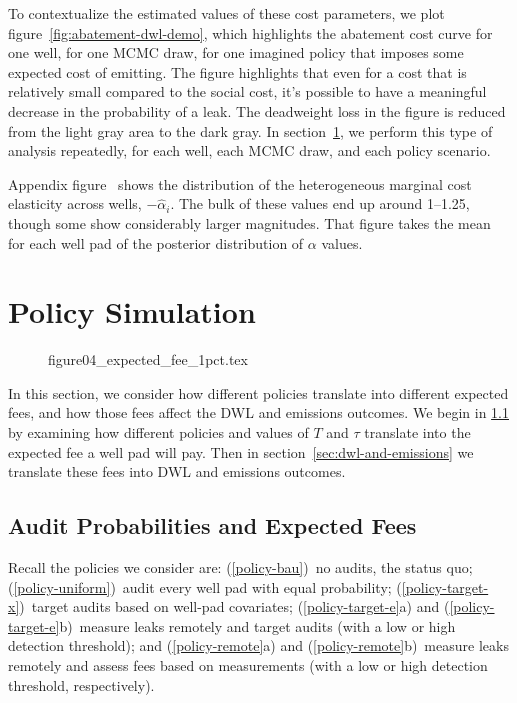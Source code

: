 To contextualize the estimated values of these cost parameters, we plot figure~\ref{fig:abatement-dwl-demo}, which highlights the abatement cost curve for one well, for one \gls{MCMC} draw, for one imagined policy that imposes some expected cost of emitting.
The figure highlights that even for a cost that is relatively small compared to the social cost, it's possible to have a meaningful decrease in the probability of a leak.
The deadweight loss in the figure is reduced from the light gray area to the dark gray.
In section~\ref{sec:policy-simulation}, we perform this type of analysis repeatedly, for each well, each \gls{MCMC} draw, and each policy scenario.


Appendix figure~\iftoggle{usexr}{\ref{fig:histogram-alphas}}{A9} shows the distribution of the heterogeneous marginal cost elasticity across wells, \(-\hat{\alpha}_i\).
The bulk of these values end up around 1--1.25, though some show considerably larger magnitudes.
That figure takes the mean for each well pad of the posterior distribution of \(\alpha\) values.


\section{Policy Simulation}
\label{sec:policy-simulation}


\begin{figure}[!bth]
{figure04_expected_fee_1pct.tex} %
\end{figure}

In this section, we consider how different policies translate into different expected fees, and how those fees affect the \gls{DWL} and emissions outcomes.
We begin in \ref{sec:audit-probabilities-and-expected-fees} by examining how different policies and values of \(T\) and \(\tau\) translate into the expected fee a well pad will pay.
Then in section~\ref{sec:dwl-and-emissions} we translate these fees into \gls{DWL} and emissions outcomes.


\subsection{Audit Probabilities and Expected Fees}
\label{sec:audit-probabilities-and-expected-fees}



Recall the policies we consider are:
(\ref{policy-bau})~no audits, the status quo;
(\ref{policy-uniform})~audit every well pad with equal probability;
(\ref{policy-target-x})~target audits based on well-pad covariates;
(\ref{policy-target-e}a) and (\ref{policy-target-e}b)~measure leaks remotely and target audits (with a low or high detection threshold); and
(\ref{policy-remote}a) and (\ref{policy-remote}b)~measure leaks remotely and assess fees based on measurements (with a low or high detection threshold, respectively).

